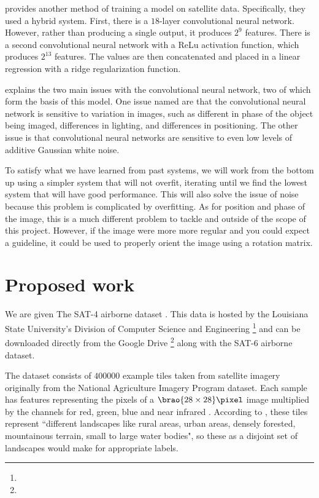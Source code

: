 \documentclass[11pt]{report}
\DeclarePairedDelimiter\brao()%
\begin{document}
\textcite{Rolf2021a} provides another method of training a model on satellite data.
Specifically, they used a hybrid system.
First, there is a \(18\)-layer convolutional neural network\cite{MATLAB2018resnet_a}.
However, rather than producing a single output,
it produces \(2^{9}\) features.
There is a second convolutional neural network with a ReLu activation function, which produces \(2^{13}\) features\cite{Rolf2021a}.
The values are then concatenated and placed in a linear regression with a ridge regularization function\cite{Rolf2021a}.

\textcite{Sharma2020a} explains the two main issues with the convolutional neural network, two of which form the basis of this model.
One issue named are that the convolutional neural network is sensitive to variation in images,
such as different in phase of the object being imaged,
differences in lighting,
and differences in positioning.
The other issue is that convolutional neural networks are sensitive to even low levels of additive Gaussian white noise.

To satisfy what we have learned from past systems,
we will work from the bottom up using a simpler system that will not overfit,
iterating until we find the lowest system that will have good performance.
This will also solve the issue of noise because this problem is complicated by overfitting.
As for position and phase of the image, this is a much different problem to tackle and outside of the scope of this project.
However, if the image were more more regular and you could expect a guideline,
it could be used to properly orient the image using a rotation matrix.

\section{Proposed work}

We are given
The SAT-4 airborne dataset%
\cite{Basu2015a}.
This data is hosted by the Louisiana State University's Division of Computer Science and Engineering%
\footnote{%
}
and can be downloaded directly from the Google Drive%
\footnote{%
}
along with the SAT-6 airborne dataset.

The dataset consists of \(\num{400000}\) example tiles
taken from satellite imagery originally from the National Agriculture Imagery Program  dataset.
Each sample has features representing the pixels of a \(\SI[parse-numbers=false]{\brao{28\times28}\!}\pixel\) image 
multiplied by the channels for red, green, blue and near infrared .
According to \textcite{Basu2015a},
these tiles represent ``different landscapes like rural areas, urban areas, densely forested, mountainous terrain, small to large water bodies",
so these as a disjoint set of landscapes would make for appropriate labels.
\end{document}
